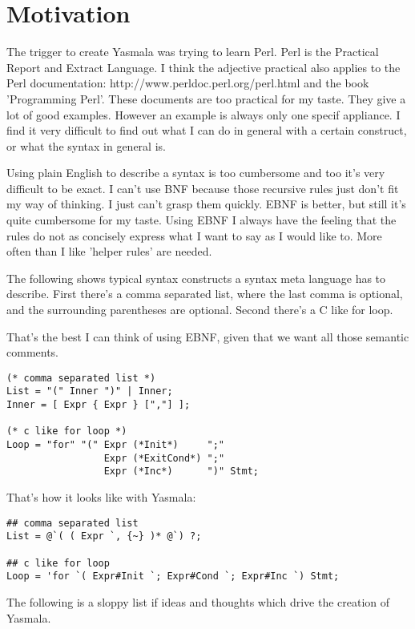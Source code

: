 \documentclass[a4paper]{report}
\begin{document}
\section{Motivation}
The trigger to create Yasmala was trying to learn Perl. Perl is the Practical
Report and Extract Language. I think the adjective practical also applies to the
Perl documentation: http://www.perldoc.perl.org/perl.html and the book
'Programming Perl'. These documents are too practical for my taste. They give a
lot of good examples. However an example is always only one specif appliance. I
find it very difficult to find out what I can do in general with a certain
construct, or what the syntax in general is.

Using plain English to describe a syntax is too cumbersome and too it's very
difficult to be exact. I can't use BNF because those recursive rules just don't
fit my way of thinking. I just can't grasp them quickly. EBNF is better, but
still it's quite cumbersome for my taste. Using EBNF I always have the feeling
that the rules do not as concisely express what I want to say as I would like to.
More often than I like 'helper rules' are needed.

The following shows typical syntax constructs a syntax meta language has to
describe. First there's a comma separated list, where the last comma is
optional, and the surrounding parentheses are optional. Second there's a C like
for loop.

That's the best I can think of using EBNF, given that we want all those semantic
comments. 

\begin{verbatim}
(* comma separated list *)
List = "(" Inner ")" | Inner;
Inner = [ Expr { Expr } [","] ];

(* c like for loop *)
Loop = "for" "(" Expr (*Init*)     ";"
                 Expr (*ExitCond*) ";"
                 Expr (*Inc*)      ")" Stmt;
\end{verbatim}

That's how it looks like with Yasmala:

\begin{verbatim}
## comma separated list
List = @`( ( Expr `, {~} )* @`) ?;

## c like for loop
Loop = 'for `( Expr#Init `; Expr#Cond `; Expr#Inc `) Stmt;
\end{verbatim}

The following is a sloppy list if ideas and thoughts which drive the creation of
Yasmala.
\end{document}
